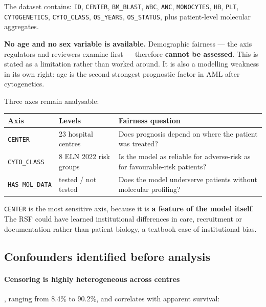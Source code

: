 \documentclass[11pt,a4paper]{article}
\newcommand{\var}[1]{\texttt{#1}}                      %
\begin{document}
The dataset contains: \var{ID}, \var{CENTER}, \var{BM\_BLAST}, \var{WBC}, \var{ANC},
\var{MONOCYTES}, \var{HB}, \var{PLT}, \var{CYTOGENETICS}, \var{CYTO\_CLASS}, \var{OS\_YEARS},
\var{OS\_STATUS}, plus patient-level molecular aggregates.

\begin{keybox}
\textbf{No age and no sex variable is available.} Demographic fairness --- the axis regulators
and reviewers examine first --- therefore \textbf{cannot be assessed}. This is stated as a
limitation rather than worked around. It is also a modelling weakness in its own right: age is
the second strongest prognostic factor in AML after cytogenetics.
\end{keybox}

Three axes remain analysable:

\begin{table}[h]
\centering
\begin{tabular}{@{}p{2.8cm} p{3.5cm} p{7.5cm}@{}}
\toprule
\textbf{Axis} & \textbf{Levels} & \textbf{Fairness question} \\
\midrule
\var{CENTER} & 23 hospital centres & Does prognosis depend on where the patient was treated? \\
\var{CYTO\_CLASS} & 8 ELN 2022 risk groups & Is the model as reliable for adverse-risk as for
favourable-risk patients? \\
\var{HAS\_MOL\_DATA} & tested / not tested & Does the model underserve patients without
molecular profiling? \\
\bottomrule
\end{tabular}
\end{table}

\var{CENTER} is the most sensitive axis, because it is \textbf{a feature of the model itself}.
The RSF could have learned institutional differences in care, recruitment or documentation
rather than patient biology, a textbook case of institutional bias.

\subsection{Confounders identified before analysis}

\paragraph{Censoring is highly heterogeneous across centres}, ranging from 8.4\% to 90.2\%, and
correlates with apparent survival:
\end{document}
